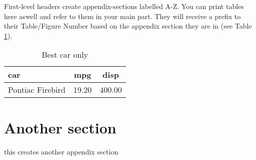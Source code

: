 \documentclass[
  man,floatsintext]{apa7}
\begin{document}
First-level headers create appendix-sections labelled A-Z. You can print tables here aswell and refer to them in your main part. They will receive a prefix to their Table/Figure Number based on the appendix section they are in (see Table \ref{tab:appendix-example}).

\begin{table}[tbp]

\begin{center}
\begin{threeparttable}

\caption{\label{tab:appendix-example}Best car only}

\begin{tabular}{lll}
\toprule
car & \multicolumn{1}{c}{mpg} & \multicolumn{1}{c}{disp}\\
\midrule
Pontiac Firebird & 19.20 & 400.00\\
\bottomrule
\end{tabular}

\end{threeparttable}
\end{center}

\end{table}

\hypertarget{another-section}{%
\section{Another section}\label{another-section}}

this creates another appendix section
\end{document}
